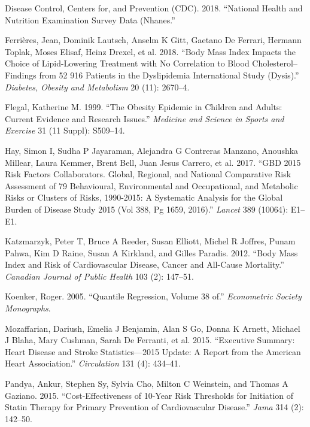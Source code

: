 \documentclass[
  12pt,
]{article}
\begin{document}
\leavevmode\hypertarget{ref-NHANES}{}%
Disease Control, Centers for, and Prevention (CDC). 2018. ``National Health and Nutrition Examination Survey Data (Nhanes.''

\leavevmode\hypertarget{ref-ferrieres2018}{}%
Ferrières, Jean, Dominik Lautsch, Anselm K Gitt, Gaetano De Ferrari, Hermann Toplak, Moses Elisaf, Heinz Drexel, et al. 2018. ``Body Mass Index Impacts the Choice of Lipid-Lowering Treatment with No Correlation to Blood Cholesterol--Findings from 52 916 Patients in the Dyslipidemia International Study (Dysis).'' \emph{Diabetes, Obesity and Metabolism} 20 (11): 2670--4.

\leavevmode\hypertarget{ref-flegal1999}{}%
Flegal, Katherine M. 1999. ``The Obesity Epidemic in Children and Adults: Current Evidence and Research Issues.'' \emph{Medicine and Science in Sports and Exercise} 31 (11 Suppl): S509--14.

\leavevmode\hypertarget{ref-hay2017gbd}{}%
Hay, Simon I, Sudha P Jayaraman, Alejandra G Contreras Manzano, Anoushka Millear, Laura Kemmer, Brent Bell, Juan Jesus Carrero, et al. 2017. ``GBD 2015 Risk Factors Collaborators. Global, Regional, and National Comparative Risk Assessment of 79 Behavioural, Environmental and Occupational, and Metabolic Risks or Clusters of Risks, 1990-2015: A Systematic Analysis for the Global Burden of Disease Study 2015 (Vol 388, Pg 1659, 2016).'' \emph{Lancet} 389 (10064): E1--E1.

\leavevmode\hypertarget{ref-katbody}{}%
Katzmarzyk, Peter T, Bruce A Reeder, Susan Elliott, Michel R Joffres, Punam Pahwa, Kim D Raine, Susan A Kirkland, and Gilles Paradis. 2012. ``Body Mass Index and Risk of Cardiovascular Disease, Cancer and All-Cause Mortality.'' \emph{Canadian Journal of Public Health} 103 (2): 147--51.

\leavevmode\hypertarget{ref-koenker2005}{}%
Koenker, Roger. 2005. ``Quantile Regression, Volume 38 of.'' \emph{Econometric Society Monographs}.

\leavevmode\hypertarget{ref-mozaffarian2015executive}{}%
Mozaffarian, Dariush, Emelia J Benjamin, Alan S Go, Donna K Arnett, Michael J Blaha, Mary Cushman, Sarah De Ferranti, et al. 2015. ``Executive Summary: Heart Disease and Stroke Statistics---2015 Update: A Report from the American Heart Association.'' \emph{Circulation} 131 (4): 434--41.

\leavevmode\hypertarget{ref-pandya2015}{}%
Pandya, Ankur, Stephen Sy, Sylvia Cho, Milton C Weinstein, and Thomas A Gaziano. 2015. ``Cost-Effectiveness of 10-Year Risk Thresholds for Initiation of Statin Therapy for Primary Prevention of Cardiovascular Disease.'' \emph{Jama} 314 (2): 142--50.
\end{document}
